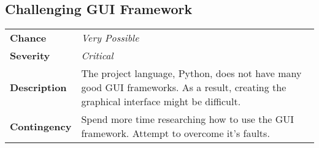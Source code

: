 \documentclass[12pt]{article}
\begin{document}
\subsection*{Challenging GUI Framework}
\begin{tabular}{ l p{10cm} }
	\textbf{Chance} & \textit{Very Possible} \\
	\textbf{Severity} & \textit{Critical} \\
	\textbf{Description} & The project language, Python, does not have many
		good GUI frameworks. As a result, creating the graphical interface
		might be difficult. \\
	\textbf{Contingency} & Spend more time researching how to use the GUI
		framework. Attempt to overcome it's faults. \\
\end{tabular}
\end{document}

